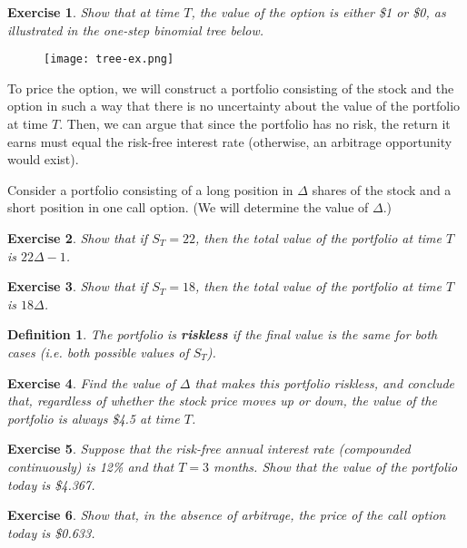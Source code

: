 \documentclass[letterpaper,10pt]{article}
\newtheorem{df}{Definition}[section]
\newtheorem{ex}{Exercise}
\begin{document}
\begin{ex}
Show that at time $T$, the value of the option is either \$1 or \$0, as illustrated in the {\em one-step binomial tree} below.
\end{ex}

\begin{center}
\begin{figure}[H]
\texttt{[image: tree-ex.png]}
\end{figure}
\end{center}

To price the option, we will construct a portfolio consisting of the stock and the option in such a way that there is no uncertainty about the value of the portfolio at time $T$.  Then, we can argue that since the portfolio has no risk, the return it earns must equal the risk-free interest rate (otherwise, an arbitrage opportunity would exist).

Consider a portfolio consisting of a long position in $\Delta$ shares of the stock and a short position in one call option.  (We will determine the value of $\Delta$.)

\begin{ex}
Show that if $S_T=22$, then the total value of the portfolio at time $T$ is $22\Delta-1$.
\end{ex}

\begin{ex}
Show that if $S_T=18$, then the total value of the portfolio at time $T$ is $18\Delta$.
\end{ex}

\begin{df} The portfolio is {\bf riskless} if the final value is the same for both cases (i.e. both possible values of $S_T$).
\end{df}  

\begin{ex}
Find the value of $\Delta$ that makes this portfolio riskless, and conclude that, regardless of whether the stock price moves up or down, the value of the portfolio is always \$4.5 at time $T$.
\end{ex}


\begin{ex}
Suppose that the risk-free annual interest rate (compounded continuously) is 12\% and that $T=3$ months.  Show that the value of the portfolio today is \$4.367. 
\end{ex}

\begin{ex}
Show that, in the absence of arbitrage, the price of the call option today is \$0.633.
\end{ex}
\end{document}

